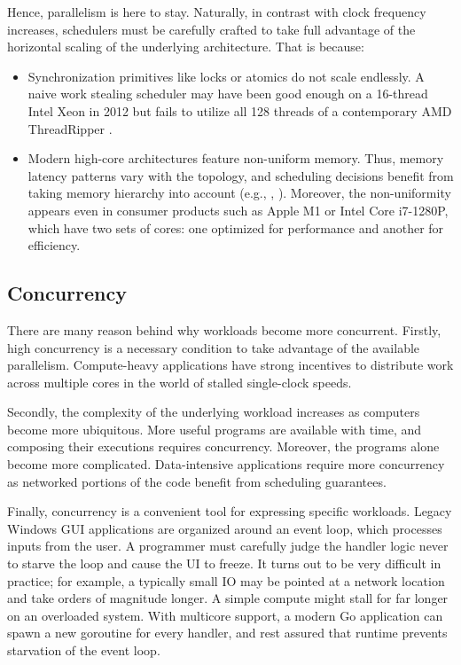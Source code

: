 \documentclass[12pt,a4paper,twoside]{report}
\begin{document}
Hence, parallelism is here to stay. Naturally, in contrast with clock frequency increases, schedulers must be carefully crafted to take full advantage of the horizontal scaling of the underlying architecture. That is because:
\begin{itemize}
    \item Synchronization primitives like locks or atomics do not scale endlessly. A naive work stealing scheduler may have been good enough on a 16-thread Intel Xeon in 2012 but fails to utilize all 128 threads of a contemporary AMD ThreadRipper \cite{Castello2016}. 
    \item Modern high-core architectures feature non-uniform memory. Thus, memory latency patterns vary with the topology, and scheduling decisions benefit from taking memory hierarchy into account (e.g., \cite{Drebes2016}, \cite{faverge:inria-00416502}). Moreover, the non-uniformity appears even in consumer products such as Apple M1 or Intel Core i7-1280P, which have two sets of cores: one optimized for performance and another for efficiency.
\end{itemize}

\subsection{Concurrency}
\label{section:intr_software_conc}
There are many reason behind why workloads become more concurrent. Firstly, high concurrency is a necessary condition to take advantage of the available parallelism. Compute-heavy applications have strong incentives to distribute work across multiple cores in the world of stalled single-clock speeds. 

Secondly, the complexity of the underlying workload increases as computers become more ubiquitous. More useful programs are available with time, and composing their executions requires concurrency. Moreover, the programs alone become more complicated. Data-intensive applications \cite{Kleppmann2017-en} require more concurrency as networked portions of the code benefit from scheduling guarantees. 

Finally, concurrency is a convenient tool for expressing specific workloads. Legacy Windows GUI applications are organized around an event loop, which processes inputs from the user. A programmer must carefully judge the handler logic never to starve the loop and cause the UI to freeze. It turns out to be very difficult in practice; for example, a typically small IO may be pointed at a network location and take orders of magnitude longer. A simple compute might stall for far longer on an overloaded system. With multicore support, a modern Go application can spawn a new goroutine for every handler, and rest assured that runtime prevents starvation of the event loop.  
\end{document}

